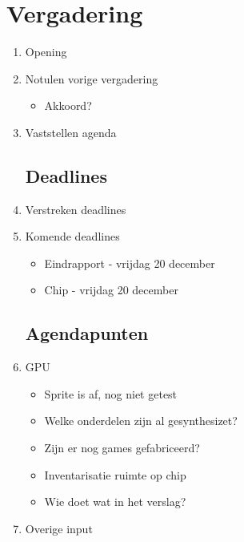 \documentclass{article}
\begin{document}
\section*{Vergadering}
\begin{enumerate}
	
	\subsection*{Vooraf}
	\item Opening
	\item Notulen vorige vergadering
	\begin{itemize}
		\item Akkoord?
	\end{itemize}
	\item Vaststellen agenda

	\subsection*{Deadlines}
	\item Verstreken deadlines
	\item Komende deadlines
	\begin{itemize}
		\item Eindrapport - vrijdag 20 december
		\item Chip - vrijdag 20 december
	\end{itemize}

	\subsection*{Agendapunten}

	\item GPU
	\begin{itemize}
		\item Sprite is af, nog niet getest
		\item Welke onderdelen zijn al gesynthesizet?
		\item Zijn er nog games gefabriceerd?
		\item Inventarisatie ruimte op chip
		\item Wie doet wat in het verslag?
	\end{itemize}

	\item Overige input

\end{enumerate}
\end{document}
